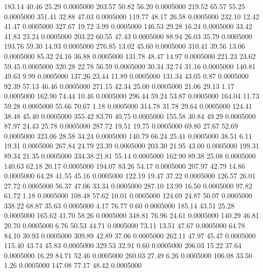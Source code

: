  183.14   40.46   25.29   0.0005000
 203.57   50.82   56.20   0.0005000
 219.52   65.57   55.25   0.0005000
 351.41   32.88   47.03   0.0005000
 119.77   48.17   26.58   0.0005000
 232.10   12.42   41.47   0.0005000
 327.67   19.72    3.99   0.0005000
 146.53   29.28   16.24   0.0005000
  33.42   41.83   23.24   0.0005000
 203.22   60.55   47.43   0.0005000
  88.94   26.03   35.79   0.0005000
 193.76   59.30   14.93   0.0005000
 276.85   13.02   45.60   0.0005000
 310.41   39.56   13.06   0.0005000
  85.32   24.16   36.88   0.0005000
 131.78   48.47   14.97   0.0005000
 221.23   23.62   59.45   0.0005000
 320.28   22.78   56.59   0.0005000
  30.34   32.74   31.16   0.0005000
 140.81   49.63    9.99   0.0005000
 137.26   23.44   11.89   0.0005000
 131.34   43.05    0.87   0.0005000
  92.39   57.13   46.46   0.0005000
 271.15   42.34   25.00   0.0005000
  21.06   29.13    1.17   0.0005000
 162.90   74.44   10.46   0.0005000
 296.44   59.24   53.87   0.0005000
 164.04   11.73   59.28   0.0005000
  55.66   70.67    1.18   0.0005000
 314.78   31.78   29.64   0.0005000
 124.41   38.48   45.40   0.0005000
 355.42   83.70   40.75   0.0005000
 155.58   30.84   49.29   0.0005000
  87.97   24.43   25.78   0.0005000
 287.72   19.51   19.75   0.0005000
  69.80   27.67   52.69   0.0005000
 323.06   28.58   34.24   0.0005000
 140.79   66.24   25.41   0.0005000
  38.51    6.11   19.31   0.0005000
 267.84   24.79   23.39   0.0005000
 203.30   21.95   43.00   0.0005000
 199.31   89.34   21.35   0.0005000
 334.38   21.81   55.14   0.0005000
 162.90   89.38   25.08   0.0005000
 140.63   62.18   20.17   0.0005000
 194.07   83.26   54.17   0.0005000
 207.97   42.79   14.86   0.0005000
  64.28   41.55   45.16   0.0005000
 122.19   19.47   37.22   0.0005000
 126.57   26.01   27.72   0.0005000
  56.37   47.06   33.34   0.0005000
 287.10   13.99   16.50   0.0005000
  97.82   61.72    1.18   0.0005000
 108.48   57.62   10.01   0.0005000
 124.69   24.87   50.07   0.0005000
 338.22   68.87   35.63   0.0005000
   4.17   76.77    0.60   0.0005000
 185.14   43.51   25.28   0.0005000
 165.62   41.70   58.26   0.0005000
 348.81   76.96   24.61   0.0005000
 140.29   46.81   20.70   0.0005000
   6.76   50.53   44.71   0.0005000
  73.11   13.51   47.67   0.0005000
  64.78   84.10   30.93   0.0005000
 309.89   42.89   37.06   0.0005000
 262.11   47.97   45.47   0.0005000
 115.40   43.74   45.83   0.0005000
 329.53   32.91    0.60   0.0005000
 206.03   15.22   37.64   0.0005000
  16.29   84.71   52.46   0.0005000
 260.03   27.49    6.26   0.0005000
 106.08   33.50    1.26   0.0005000
 147.08   77.17   48.42   0.0005000
